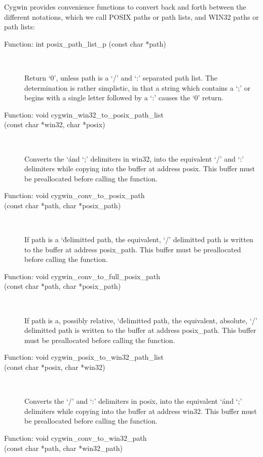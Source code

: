 \begin{description}
    Cygwin provides convenience functions to convert back and forth between the different notations, which we call POSIX paths or path lists, and WIN32 paths or path lists: 

\begin{description}
\item[Function: int posix\_{}path\_{}list\_{}p (const char *path)]
\

    Return `0', unless path is a `/' and `:' separated path list. The determination is rather simplistic, in that a string which contains a `;' or begins with a single letter followed by a `:' causes the `0' return. 

\item[Function: void cygwin\_{}win32\_{}to\_{}posix\_{}path\_{}list]
\item[(const char *win32, char *posix)]
\

    Converts the `\' and `;' delimiters in win32, into the equivalent `/' and `:' delimiters while copying into the buffer at address posix. This buffer must be preallocated before calling the function. 

\item[Function: void cygwin\_{}conv\_{}to\_{}posix\_{}path] 
\item[(const char *path, char *posix\_{}path)]
\

    If path is a `\' delimitted path, the equivalent, `/' delimitted path is written to the buffer at address posix\_{}path. This buffer must be preallocated before calling the function. 

\item[Function: void cygwin\_{}conv\_{}to\_{}full\_{}posix\_{}path]
\item[(const char *path, char *posix\_{}path)]
\

    If path is a, possibly relative, `\' delimitted path, the equivalent, absolute, `/' delimitted path is written to the buffer at address posix\_{}path. This buffer must be preallocated before calling the function. 

\item[Function: void cygwin\_{}posix\_{}to\_{}win32\_{}path\_{}list]
\item[(const char *posix, char *win32)]
\

    Converts the `/' and `:' delimiters in posix, into the equivalent `\' and `;' delimiters while copying into the buffer at address win32. This buffer must be preallocated before calling the function. 

\item[Function: void cygwin\_{}conv\_{}to\_{}win32\_{}path]
\item[(const char *path, char *win32\_{}path)]
\


\end{description}
\end{description}

